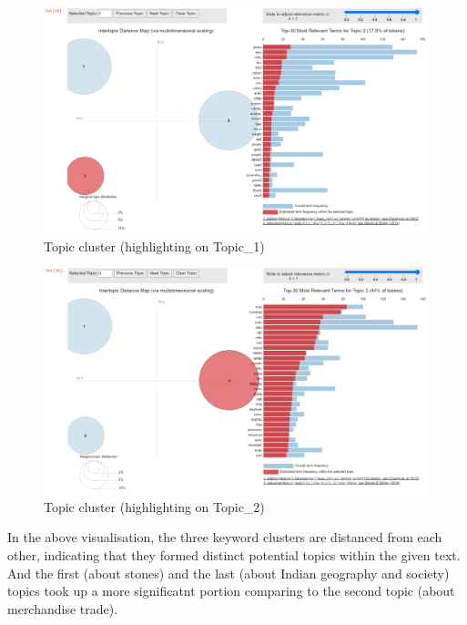 \documentclass[
  12pt,
]{article}
\begin{document}
\begin{figure}

{\centering \includegraphics{NHthesis_structure_files/figure-pdf/fig-topic_cluster2-output-1.png}

}

\caption{\label{fig-topic_cluster2}Topic cluster (highlighting on
Topic\_1)}

\end{figure}

\begin{figure}

{\centering \includegraphics{NHthesis_structure_files/figure-pdf/fig-topic_cluster3-output-1.png}

}

\caption{\label{fig-topic_cluster3}Topic cluster (highlighting on
Topic\_2)}

\end{figure}

In the above visualisation, the three keyword clusters are distanced
from each other, indicating that they formed distinct potential topics
within the given text. And the first (about stones) and the last (about
Indian geography and society) topics took up a more significatnt portion
comparing to the second topic (about merchandise trade).
\end{document}
